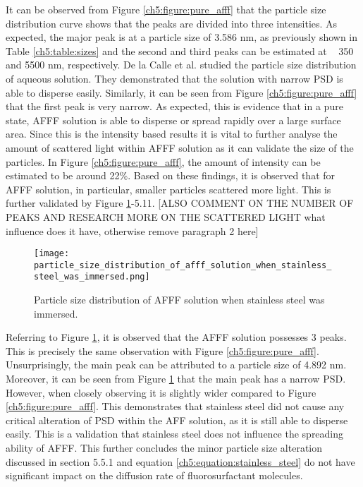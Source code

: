  It can be observed from Figure \ref{ch5:figure:pure_afff} that the particle size distribution curve shows that the peaks are divided into three intensities. As expected, the major peak is at a particle size of 3.586 nm, as previously shown in Table \ref{ch5:table:sizes} and the second and third peaks can be estimated at ~ 350 and 5500 nm, respectively. De la Calle et al. \cite{mudunkotuwa2014atr} studied the particle size distribution of aqueous solution. They demonstrated that the solution with narrow PSD is able to disperse easily. Similarly, it can be seen from Figure \ref{ch5:figure:pure_afff} that the first peak is very narrow. As expected, this is evidence that in a pure state, AFFF solution is able to disperse or spread rapidly over a large surface area. 
 Since this is the intensity based results it is vital to further analyse the amount of scattered light within AFFF solution as it can validate the size of the particles. In Figure \ref{ch5:figure:pure_afff}, the amount of intensity can be estimated to be around 22\%. Based on these findings, it is observed that for AFFF solution, in particular, smaller particles scattered more light. This is further validated by Figure \ref{ch5:figure:stainless_steel}-5.11.
 [ALSO COMMENT ON THE NUMBER OF PEAKS AND RESEARCH MORE ON THE SCATTERED LIGHT what influence does it have, otherwise remove paragraph 2 here]

\begin{figure}[H]
    \centering
    \texttt{[image: particle\_size\_distribution\_of\_afff\_solution\_when\_stainless\_steel\_was\_immersed.png]}
    \caption{Particle size distribution of AFFF solution when stainless steel was immersed.}
    \label{ch5:figure:stainless_steel}
\end{figure}

Referring to Figure \ref{ch5:figure:stainless_steel}, it is observed that the AFFF solution possesses 3 peaks. This is precisely the same observation with Figure \ref{ch5:figure:pure_afff}. Unsurprisingly, the main peak can be attributed to a particle size of 4.892 nm. Moreover, it can be seen from Figure \ref{ch5:figure:stainless_steel} that the main peak has a narrow PSD. However, when closely observing it is slightly wider compared to Figure \ref{ch5:figure:pure_afff}. This demonstrates that stainless steel did not cause any critical alteration of PSD within the AFF solution, as it is still able to disperse easily. This is a validation that stainless steel does not influence the spreading ability of AFFF. This further concludes the minor particle size alteration discussed in section 5.5.1 and equation \ref{ch5:equation:stainless_steel} do not have significant impact on the diffusion rate of fluorosurfactant molecules.     
  
